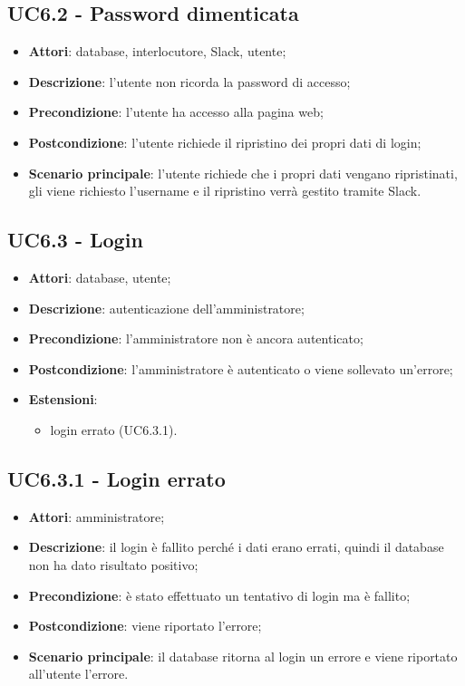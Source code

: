 \documentclass[../AnalisiDeiRequisiti.tex]{subfiles}
\begin{document}
\subsection{UC6.2 - Password dimenticata} 
\label{sssec:UC6.2} 
\begin{itemize} 
\item \textbf{Attori}: database, interlocutore, Slack, utente;
\item \textbf{Descrizione}: l'utente non ricorda la password di accesso;
\item \textbf{Precondizione}: l'utente ha accesso alla pagina web;
\item \textbf{Postcondizione}: l'utente richiede il ripristino dei propri dati di login;
\item \textbf{Scenario principale}: l'utente richiede che i propri dati vengano ripristinati, gli viene richiesto l'username e il ripristino verrà gestito tramite Slack.\end{itemize} 
\subsection{UC6.3 - Login} 
\label{sssec:UC6.3} 
\begin{itemize} 
\item \textbf{Attori}: database, utente;
\item \textbf{Descrizione}: autenticazione dell'amministratore;
\item \textbf{Precondizione}: l'amministratore non è ancora autenticato;
\item \textbf{Postcondizione}: l'amministratore è autenticato o viene sollevato un'errore;
\item \textbf{Estensioni}:\begin{itemize}\item login errato (UC6.3.1).\end{itemize}
\end{itemize} 
\subsection{UC6.3.1 - Login errato} 
\label{sssec:UC6.3.1} 
\begin{itemize} 
\item \textbf{Attori}: amministratore;
\item \textbf{Descrizione}: il login è fallito perché i dati erano errati, quindi il database non ha dato risultato positivo;
\item \textbf{Precondizione}: è stato effettuato un tentativo di login ma è fallito;
\item \textbf{Postcondizione}: viene riportato l'errore;
\item \textbf{Scenario principale}: il database ritorna al login un errore e viene riportato all'utente l'errore.\end{itemize} 
\end{document}
